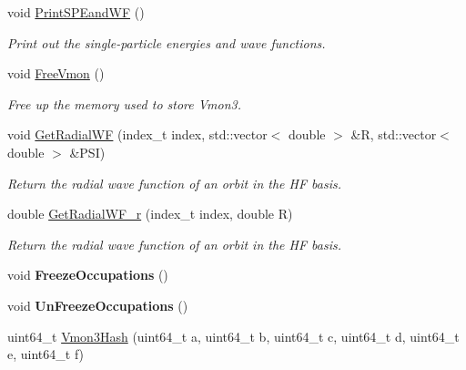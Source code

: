 \begin{DoxyCompactItemize}
\mbox{\label{classHartreeFock_a51d5163a8df635593edbeaa531aa5a34}} 
void \hyperlink{classHartreeFock_a51d5163a8df635593edbeaa531aa5a34}{Print\+S\+P\+Eand\+WF} ()
\begin{DoxyCompactList}\small\item\em Print out the single-\/particle energies and wave functions. \end{DoxyCompactList}\item 
\mbox{\label{classHartreeFock_aef3c1b45c5418ead19f258774a301f83}} 
void \hyperlink{classHartreeFock_aef3c1b45c5418ead19f258774a301f83}{Free\+Vmon} ()
\begin{DoxyCompactList}\small\item\em Free up the memory used to store Vmon3. \end{DoxyCompactList}\item 
\mbox{\label{classHartreeFock_a948748d946c4186bce3252a6be2076df}} 
void \hyperlink{classHartreeFock_a948748d946c4186bce3252a6be2076df}{Get\+Radial\+WF} (index\+\_\+t index, std\+::vector$<$ double $>$ \&R, std\+::vector$<$ double $>$ \&P\+SI)
\begin{DoxyCompactList}\small\item\em Return the radial wave function of an orbit in the HF basis. \end{DoxyCompactList}\item 
\mbox{\label{classHartreeFock_a29de897a332985f5b08bd0f08a466db3}} 
double \hyperlink{classHartreeFock_a29de897a332985f5b08bd0f08a466db3}{Get\+Radial\+W\+F\+\_\+r} (index\+\_\+t index, double R)
\begin{DoxyCompactList}\small\item\em Return the radial wave function of an orbit in the HF basis. \end{DoxyCompactList}\item 
\mbox{\label{classHartreeFock_a3fb9fc68d98aedc4cf1aae52da237339}} 
void {\bfseries Freeze\+Occupations} ()
\item 
\mbox{\label{classHartreeFock_ab7aa734d2b1df54ddba236f279269fcc}} 
void {\bfseries Un\+Freeze\+Occupations} ()
\item 
uint64\+\_\+t \hyperlink{classHartreeFock_ab863d5d020e15854d4d591ec0ce6a1a0}{Vmon3\+Hash} (uint64\+\_\+t a, uint64\+\_\+t b, uint64\+\_\+t c, uint64\+\_\+t d, uint64\+\_\+t e, uint64\+\_\+t f)

\end{DoxyCompactItemize}
